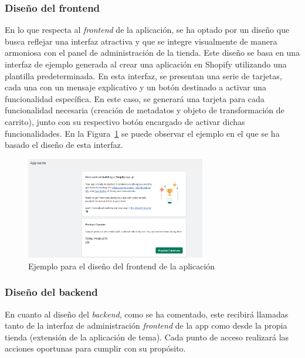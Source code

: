 \documentclass[11pt]{article}
\begin{document}
\subsubsection{Diseño del frontend}

En lo que respecta al \textit{frontend} de la aplicación, se ha optado por un diseño que busca reflejar una interfaz atractiva
y que se integre visualmente de manera armoniosa con el panel de administración de la tienda. 
Este diseño se basa en una interfaz de ejemplo generada al crear una aplicación en Shopify utilizando 
una plantilla predeterminada. En esta interfaz, se presentan una serie de tarjetas, cada una con un mensaje 
explicativo y un botón destinado a activar una funcionalidad específica. En este caso, se generará una tarjeta 
para cada funcionalidad necesaria (creación de metadatos y objeto de transformación de carrito), junto con su respectivo botón encargado de 
activar dichas funcionalidades. En la Figura~\ref{fig:disenoFront} se puede observar el ejemplo en el que se ha basado el diseño de esta interfaz.

\begin{figure}[H]
    \centering
    \includegraphics[width=0.7\textwidth]{imagenes-diseño/diseñoFrontend.png}
    \caption{\label{fig:disenoFront}Ejemplo para el diseño del frontend de la aplicación}
    \vspace{\fill}
\end{figure}

\subsubsection{Diseño del backend}
En cuanto al diseño del \textit{backend}, como se ha comentado, este recibirá llamadas tanto de la interfaz de administración {\textit{frontend} de la app} como
desde la propia tienda (extensión de la aplicación de tema). Cada punto de acceso realizará las acciones oportunas para cumplir con su propósito.
\end{document}
